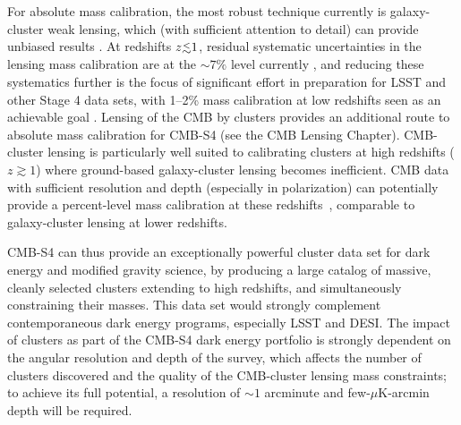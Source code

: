For absolute mass calibration, the most robust technique currently is galaxy-cluster weak lensing, which (with sufficient attention to detail) can provide unbiased results \cite{Corless:2009hi,Becker:2010xj}. At redshifts $z\lsim1$, residual systematic uncertainties in the lensing mass calibration are at the $\sim7\%$ level currently \cite{Applegate:2012kr}, and reducing these systematics further is the focus of significant effort in preparation for LSST and other Stage 4 data sets, with 1--2\% mass calibration at low redshifts seen as an achievable goal \cite{Abate:2012za}. Lensing of the CMB by clusters \cite{Madhavacheril:2014slf,Baxter:2014frs,Melin:2014uaa} provides an additional route to absolute mass calibration for CMB-S4 (see the CMB Lensing Chapter). CMB-cluster lensing is particularly well suited to calibrating clusters at high redshifts ($z\gtrsim1$) where ground-based galaxy-cluster lensing becomes inefficient. CMB data with sufficient resolution and depth (especially in polarization) can potentially provide a percent-level mass calibration at these redshifts~\cite{Hu:2007bt}, comparable to galaxy-cluster lensing at lower redshifts.

CMB-S4 can thus provide an exceptionally powerful cluster data set for dark energy and modified gravity science, by producing a large catalog of massive, cleanly selected clusters extending to high redshifts, and simultaneously constraining their masses. This data set would strongly complement contemporaneous dark energy programs, especially LSST and DESI. The impact of clusters as part of the CMB-S4 dark energy portfolio is strongly dependent on the angular resolution and depth of the survey, which affects the number of clusters discovered and the quality of the CMB-cluster lensing mass constraints; to achieve its full potential, a resolution of $\sim1$ arcminute and few-$\mu$K-arcmin depth will be required.








